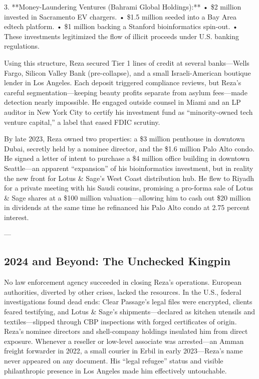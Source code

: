 3. **Money-Laundering Ventures (Bahrami Global Holdings):**
   • \$2 million invested in Sacramento EV chargers.
   • \$1.5 million seeded into a Bay Area edtech platform.
   • \$1 million backing a Stanford bioinformatics spin-out.
   • These investments legitimized the flow of illicit proceeds under U.S. banking regulations.

Using this structure, Reza secured Tier 1 lines of credit at several banks—Wells Fargo, Silicon Valley Bank (pre-collapse), and a small Israeli-American boutique lender in Los Angeles. Each deposit triggered compliance reviews, but Reza’s careful segmentation—keeping beauty profits separate from asylum fees—made detection nearly impossible. He engaged outside counsel in Miami and an LP auditor in New York City to certify his investment fund as “minority-owned tech venture capital,” a label that eased FDIC scrutiny.

By late 2023, Reza owned two properties: a \$3 million penthouse in downtown Dubai, secretly held by a nominee director, and the \$1.6 million Palo Alto condo. He signed a letter of intent to purchase a \$4 million office building in downtown Seattle—an apparent “expansion” of his bioinformatics investment, but in reality the new front for Lotus \& Sage’s West Coast distribution hub. He flew to Riyadh for a private meeting with his Saudi cousins, promising a pro-forma sale of Lotus \& Sage shares at a \$100 million valuation—allowing him to cash out \$20 million in dividends at the same time he refinanced his Palo Alto condo at 2.75 percent interest.

---

\subsection{2024 and Beyond: The Unchecked Kingpin}

No law enforcement agency succeeded in closing Reza’s operations. European authorities, diverted by other crises, lacked the resources. In the U.S., federal investigations found dead ends: Clear Passage’s legal files were encrypted, clients feared testifying, and Lotus \& Sage’s shipments—declared as kitchen utensils and textiles—slipped through CBP inspections with forged certificates of origin. Reza’s nominee directors and shell-company holdings insulated him from direct exposure. Whenever a reseller or low-level associate was arrested—an Amman freight forwarder in 2022, a small courier in Erbil in early 2023—Reza’s name never appeared on any document. His “legal refugee” status and visible philanthropic presence in Los Angeles made him effectively untouchable.

